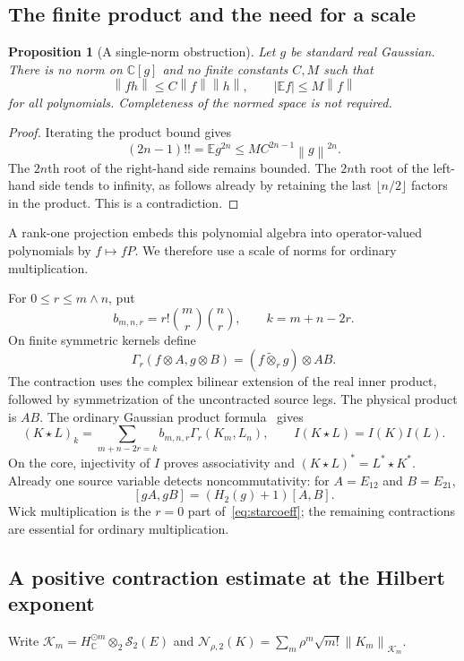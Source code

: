\documentclass[11pt,a4paper]{amsart}
\numberwithin{equation}{section}
\newtheorem{proposition}[theorem]{Proposition}
\theoremstyle{definition}
\theoremstyle{remark}
\newcommand{\C}{\mathbb C}
\newcommand{\E}{\mathbb E}
\newcommand{\Sch}{\mathcal S}
\newcommand{\norm}[1]{\left\lVert#1\right\rVert}
\begin{document}
\subsection{The finite product and the need for a scale}
\begin{proposition}[A single-norm obstruction]\label{prop:nobanalg}
Let $g$ be standard real Gaussian. There is no norm on $\C[g]$ and no finite constants $C,M$ such that
\begin{equation}\label{eq:banachnogo}
 \norm{fh}\le C\norm f\norm h,\qquad |\E f|\le M\norm f
\end{equation}
for all polynomials. Completeness of the normed space is not required.
\end{proposition}
\begin{proof}
Iterating the product bound gives
\[
 (2n-1)!!=\E g^{2n}\le MC^{2n-1}\norm g^{2n}.
\]
The $2n$th root of the right-hand side remains bounded. The $2n$th root of the left-hand side tends to infinity, as follows already by retaining the last $\lfloor n/2\rfloor$ factors in the product. This is a contradiction.
\end{proof}
A rank-one projection embeds this polynomial algebra into operator-valued polynomials by $f\mapsto fP$. We therefore use a scale of norms for ordinary multiplication.

For $0\le r\le m\wedge n$, put
\[
 b_{m,n,r}=r!\binom mr\binom nr,\qquad k=m+n-2r.
\]
On finite symmetric kernels define
\begin{equation}\label{eq:Gamma}
 \Gamma_r(f\otimes A,g\otimes B)
 =(f\widetilde\otimes_rg)\otimes AB.
\end{equation}
The contraction uses the complex bilinear extension of the real inner product, followed by symmetrization of the uncontracted source legs. The physical product is $AB$. The ordinary Gaussian product formula~\cite{Nourdin} gives
\begin{equation}\label{eq:starcoeff}
 (K\star L)_k=\sum_{m+n-2r=k}b_{m,n,r}\Gamma_r(K_m,L_n),
 \qquad I(K\star L)=I(K)I(L).
\end{equation}
On the core, injectivity of $I$ proves associativity and
$(K\star L)^*=L^*\star K^*$. Already one source variable detects noncommutativity: for $A=E_{12}$ and $B=E_{21}$,
\[
 [gA,gB]=(H_2(g)+1)[A,B].
\]
Wick multiplication is the $r=0$ part of~\eqref{eq:starcoeff}; the remaining contractions are essential for ordinary multiplication.

\subsection{A positive contraction estimate at the Hilbert exponent}
Write
$\mathcal K_m=H_\C^{\odot m}\otimes_2\Sch_2(E)$ and
$\mathcal N_{\rho,2}(K)=\sum_m\rho^m\sqrt{m!}\norm{K_m}_{\mathcal K_m}$.
\end{document}
